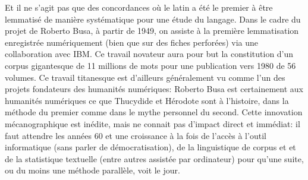Et il ne s'agit pas que des concordances où le latin a été le premier à être lemmatisé de manière systématique pour une étude du langage. Dans le cadre du projet de Roberto Busa, à partir de 1949, on assiste à la première lemmatisation enregistrée numériquement (bien que sur des fiches perforées) via une collaboration avec IBM. Ce travail novateur aura pour but la constitution d'un corpus gigantesque de 11 millions de mots pour une publication vers 1980 de 56 volumes. Ce travail titanesque est d'ailleurs généralement vu comme l'un des projets fondateurs des humanités numériques: Roberto Busa est certainement aux humanités numériques ce que Thucydide et Hérodote sont à l'histoire, dans la méthode du premier comme dans le mythe personnel du second. Cette innovation mécanographique est inédite, mais ne connait pas d'impact direct et immédiat: il faut attendre les années 60 et une  croissance à la fois de l'accès à l'outil informatique (sans parler de démocratisation), de la linguistique de corpus et et de la statistique textuelle (entre autres assistée par ordinateur) pour qu'une suite, ou du moins une méthode parallèle, voit le jour. 

